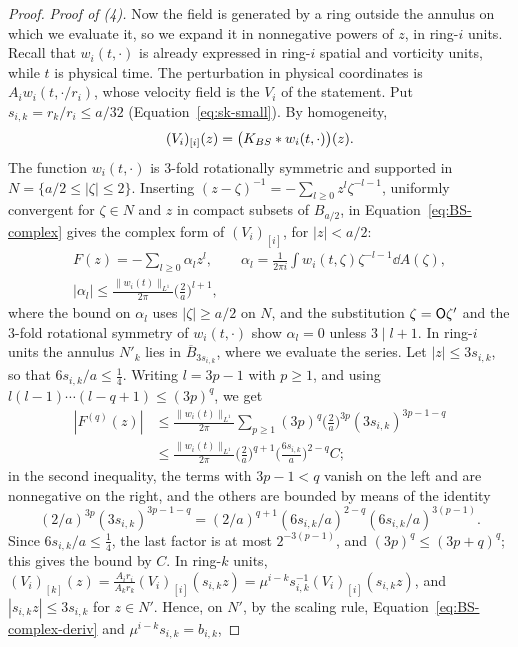 \begin{proof}
\emph{Proof of (4).} Now the field is generated by a ring outside the annulus
on which we evaluate it, so we expand it in nonnegative powers of $z$, in
ring-$i$ units. Recall that $w_i(t,\cdot)$ is already expressed in ring-$i$
spatial and vorticity units, while $t$ is physical time. The perturbation in
physical coordinates is $A_iw_i(t,\cdot/r_i)$, whose velocity field is the
$V_i$ of the statement. Put $s_{i,k}=r_k/r_i\le a/32$
(Equation~\eqref{eq:sk-small}). By homogeneity,
\[
(V_i)_{[i]}(z)=\big(K_{BS}\ast w_i(t,\cdot)\big)(z).
\]
The function $w_i(t,\cdot)$ is $3$-fold rotationally symmetric and supported in
$N=\{a/2\le|\zeta|\le2\}$. Inserting
$(z-\zeta)^{-1}=-\sum_{l\ge0}z^l\zeta^{-l-1}$, uniformly convergent for
$\zeta\in N$ and $z$ in compact subsets of $B_{a/2}$, in
Equation~\eqref{eq:BS-complex} gives the complex form of $(V_i)_{[i]}$, for $|z|<a/2$:
\[
\begin{gathered}
F(z)=-\sum_{l\ge0}\alpha_lz^l,\qquad
\alpha_l=\frac1{2\pi i}\int w_i(t,\zeta)\zeta^{-l-1}\dd A(\zeta),\\
|\alpha_l|\le\frac{\|w_i(t)\|_{L^1}}{2\pi}\Big(\frac2a\Big)^{l+1},
\end{gathered}
\]
where the bound on $\alpha_l$ uses $|\zeta|\ge a/2$ on $N$, and the
substitution $\zeta=\mathsf{O}\zeta'$ and the $3$-fold rotational symmetry of $w_i(t,\cdot)$ show
$\alpha_l=0$ unless $3\mid l+1$.
In ring-$i$ units the annulus $N'_k$ lies in $\overline B_{3s_{i,k}}$, where we
evaluate the series. Let $|z|\le3s_{i,k}$, so that $6s_{i,k}/a\le\frac14$. Writing $l=3p-1$ with
$p\ge1$, and using $l(l-1)\cdots(l-q+1)\le(3p)^q$, we get
\[
\begin{aligned}
|F^{(q)}(z)|&\le\frac{\|w_i(t)\|_{L^1}}{2\pi}\sum_{p\ge1}(3p)^q\Big(\frac2a\Big)^{3p}(3s_{i,k})^{3p-1-q}\\
&\le\frac{\|w_i(t)\|_{L^1}}{2\pi}\Big(\frac2a\Big)^{q+1}\Big(\frac{6s_{i,k}}a\Big)^{2-q}C;
\end{aligned}
\]
in the second inequality, the terms with $3p-1<q$ vanish on the left and are
nonnegative on the right, and the others are bounded by means of the identity
\[
(2/a)^{3p}(3s_{i,k})^{3p-1-q}=(2/a)^{q+1}(6s_{i,k}/a)^{2-q}(6s_{i,k}/a)^{3(p-1)}.
\]
Since $6s_{i,k}/a\le\frac14$, the last factor is at most $2^{-3(p-1)}$, and
$(3p)^q\le(3p+q)^q$; this gives the bound by $C$.
In ring-$k$ units,
$(V_i)_{[k]}(z)=\frac{A_ir_i}{A_kr_k}(V_i)_{[i]}(s_{i,k}z)=\mu^{i-k}s_{i,k}^{-1}(V_i)_{[i]}(s_{i,k}z)$,
and $|s_{i,k}z|\le3s_{i,k}$ for $z\in N'$. Hence, on $N'$, by the scaling rule,
Equation~\eqref{eq:BS-complex-deriv} and $\mu^{i-k}s_{i,k}=b_{i,k}$,

\end{proof}
